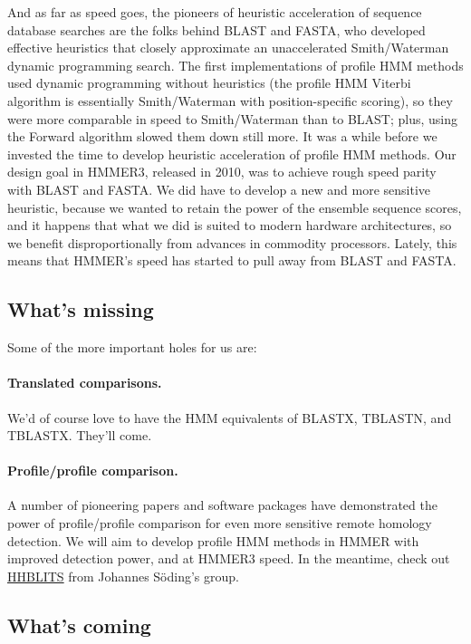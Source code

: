 And as far as speed goes, the pioneers of heuristic acceleration of
sequence database searches are the folks behind BLAST and FASTA, who
developed effective heuristics that closely approximate an
unaccelerated Smith/Waterman dynamic programming search.  The first
implementations of profile HMM methods used dynamic programming
without heuristics (the profile HMM Viterbi algorithm is essentially
Smith/Waterman with position-specific scoring), so they were more
comparable in speed to Smith/Waterman than to BLAST; plus, using the
Forward algorithm slowed them down still more. It was a while before
we invested the time to develop heuristic acceleration of profile HMM
methods. Our design goal in HMMER3, released in 2010, was to achieve
rough speed parity with BLAST and FASTA. We did have to develop a new
and more sensitive heuristic, because we wanted to retain the power of
the ensemble sequence scores, and it happens that what we did is
suited to modern hardware architectures, so we benefit
disproportionally from advances in commodity processors. Lately, this
means that HMMER's speed has started to pull away from BLAST and
FASTA.



\subsection{What's missing}

Some of the more important holes for us are:

\paragraph{Translated comparisons.} We'd of course love to have the HMM
equivalents of BLASTX, TBLASTN, and TBLASTX. They'll come.

\paragraph{Profile/profile comparison.} A number of pioneering papers and
software packages have demonstrated the power of profile/profile
comparison for even more sensitive remote homology detection. We will
aim to develop profile HMM methods in HMMER with improved detection
power, and at HMMER3 speed. In the meantime, check out
\href{https://toolkit.tuebingen.mpg.de/\#/tools/hhblits}{HHBLITS} from
Johannes S\"oding's group.


\subsection{What's coming}

